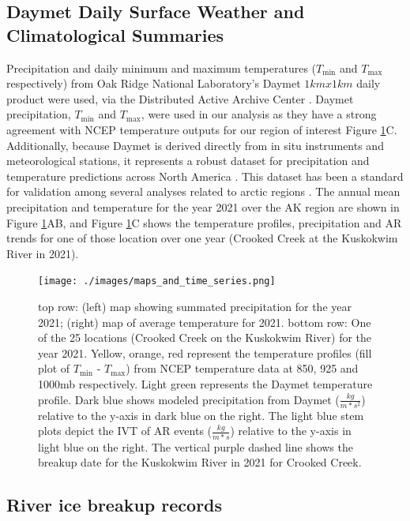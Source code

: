 \documentclass[12pts,draft]{AR_analysis_}
\begin{document}
\subsection{Daymet Daily Surface Weather and Climatological Summaries}

Precipitation and daily
minimum and maximum temperatures ($T_{\text{min}}$ and $T_{\text{max}}$ respectively) 
from Oak Ridge National
Laboratory's Daymet $1kmx1km$ daily product were used, via the
Distributed Active Archive Center \cite{daymet}. Daymet precipitation, 
$T_{\text{min}}$ and $T_{\text{max}}$, were used in our analysis as they
have a strong agreement with NCEP temperature outputs for our 
region of interest
Figure \ref{fig:concatenated_maps_precip_temp_plot}C. Additionally, 
because Daymet is derived directly from in situ instruments 
and meteorological stations, it represents a robust 
dataset for precipitation and temperature predictions across North
America \cite{daymet2021}. This dataset has been a standard for validation 
among several analyses related to arctic regions \cite{Diro2019, 
Akinsanola2024}. The annual mean precipitation and 
temperature for the year 2021 over the AK region are shown in Figure 
\ref{fig:concatenated_maps_precip_temp_plot}AB, and 
Figure \ref{fig:concatenated_maps_precip_temp_plot}C 
shows the temperature profiles, precipitation and AR trends
for one of those location over one year (Crooked 
Creek at the Kuskokwim River in 2021). 

\begin{figure}
\centering
\texttt{[image: ./images/maps\_and\_time\_series.png]}
	\caption{top row: (left) map showing summated precipitation for the
	year 2021; (right) map of average temperature for 2021. bottom row:
	One of the 25 locations (Crooked Creek on the Kuskokwim
	River) for the year 2021. Yellow, orange, red represent the
	temperature profiles (fill plot of $T_{\text{min}}$ -
	$T_{\text{max}}$) from NCEP
	temperature data at 850, 925 and 1000mb respectively. Light
	green represents the Daymet temperature profile. Dark blue shows
	modeled precipitation from Daymet ($\frac{kg}{m*s^{2}}$) 
	relative to the y-axis in dark blue
	on the right. The light blue stem
	plots depict the IVT of AR events ($\frac{kg}{m*s}$) 
	relative to the y-axis in light blue
	on the right. The vertical purple dashed line shows the breakup
	date for the Kuskokwim River in 2021 for Crooked Creek.}
\label{fig:concatenated_maps_precip_temp_plot} 
\end{figure}

\subsection{River ice breakup records}
\end{document}
